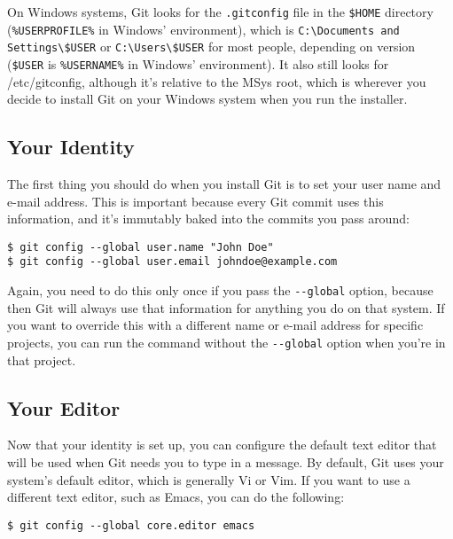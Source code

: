 \documentclass[a4paper]{book}
\newcounter{tab}[chapter]
\begin{document}
On Windows systems, Git looks for the \texttt{.gitconfig} file in the \texttt{\$HOME} directory (\texttt{\%USERPROFILE\%} in Windows' environment), which is \texttt{C:\textbackslash{}Documents and Settings\textbackslash{}\$USER} or \texttt{C:\textbackslash{}Users\textbackslash{}\$USER} for most people, depending on version (\texttt{\$USER} is \texttt{\%USERNAME\%} in Windows' environment). It also still looks for /etc/gitconfig, although it's relative to the MSys root, which is wherever you decide to install Git on your Windows system when you run the installer.

\subsection{Your Identity}

The first thing you should do when you install Git is to set your user name and e-mail address. This is important because every Git commit uses this information, and it's immutably baked into the commits you pass around:

\begin{shaded}\begin{verbatim}
$ git config --global user.name "John Doe"
$ git config --global user.email johndoe@example.com
\end{verbatim}\end{shaded}

Again, you need to do this only once if you pass the \texttt{-{}-global} option, because then Git will always use that information for anything you do on that system. If you want to override this with a different name or e-mail address for specific projects, you can run the command without the \texttt{-{}-global} option when you're in that project.

\subsection{Your Editor}

Now that your identity is set up, you can configure the default text editor that will be used when Git needs you to type in a message. By default, Git uses your system's default editor, which is generally Vi or Vim. If you want to use a different text editor, such as Emacs, you can do the following:

\begin{shaded}\begin{verbatim}
$ git config --global core.editor emacs
\end{verbatim}\end{shaded}
\end{document}
